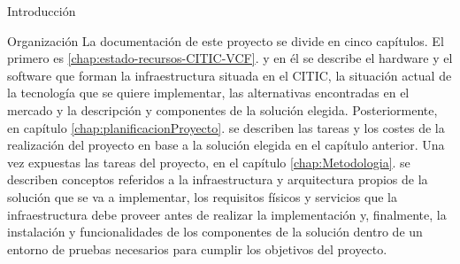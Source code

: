 \begin{chapter}{Introducción}
\begin{section}{Organización}
    La documentación de este proyecto se divide en cinco capítulos. El primero es \ref{chap:estado-recursos-CITIC-VCF}. y en él se describe el hardware y el software que forman la infraestructura situada en el CITIC, la situación actual de la tecnología que se quiere implementar, las alternativas encontradas en el mercado y la descripción y componentes de la solución elegida. Posteriormente, en capítulo \ref{chap:planificacionProyecto}. se describen las tareas y los costes de la realización del proyecto en base a la solución elegida en el capítulo anterior. Una vez expuestas las tareas del proyecto, en el capítulo \ref{chap:Metodologia}. se describen conceptos referidos a la infraestructura y arquitectura propios de la solución que se va a implementar, los requisitos físicos y servicios que la infraestructura debe proveer antes de realizar la implementación y, finalmente, la instalación y funcionalidades de los componentes de la solución dentro de un entorno de pruebas necesarios para cumplir los objetivos del proyecto.
\end{section}

\end{chapter}